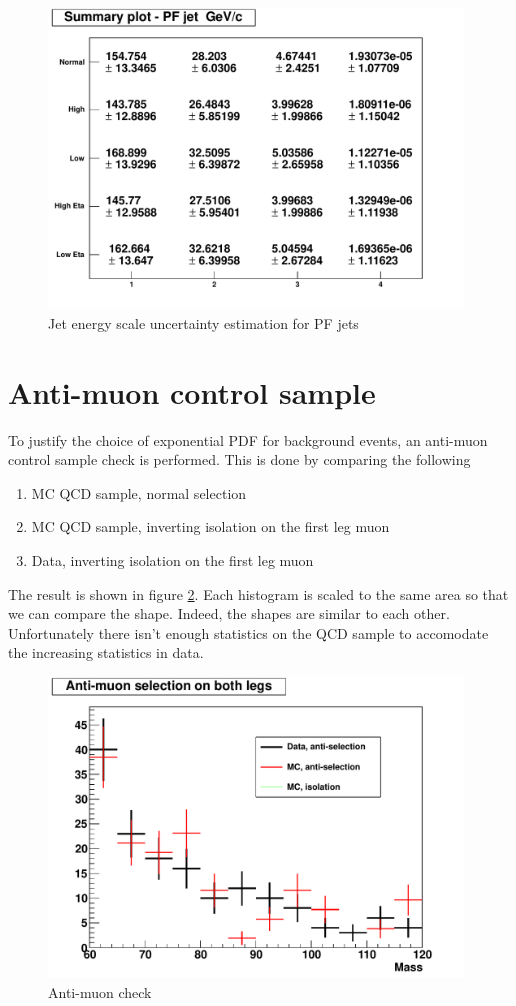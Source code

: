 \documentclass[10pt,a4paper,onecolumn]{article}
\begin{document}
\begin{figure}
\includegraphics[width=110mm]{PFJet_JES.pdf}
\caption{Jet energy scale uncertainty estimation for PF jets}
\label{Figure_PFJetJES}
\end{figure}


\section{Anti-muon control sample}

To justify the choice of exponential PDF for background events, an anti-muon control sample check is performed.
This is done by comparing the following

\begin{enumerate}
\item MC QCD sample, normal selection
\item MC QCD sample, inverting isolation on the first leg muon
\item Data, inverting isolation on the first leg muon
\end{enumerate}

The result is shown in figure \ref{Figure_AntiMuonSingleLeg}.  Each histogram is scaled to the same area so that we can compare the shape.
Indeed, the shapes are similar to each other.  Unfortunately there isn't enough statistics on the QCD sample to accomodate the increasing statistics in data.

\begin{figure}
\includegraphics[width=110mm]{DoubleLegAntiMuon.pdf}
\caption{Anti-muon check}
\label{Figure_AntiMuonSingleLeg}
\end{figure}
\end{document}
